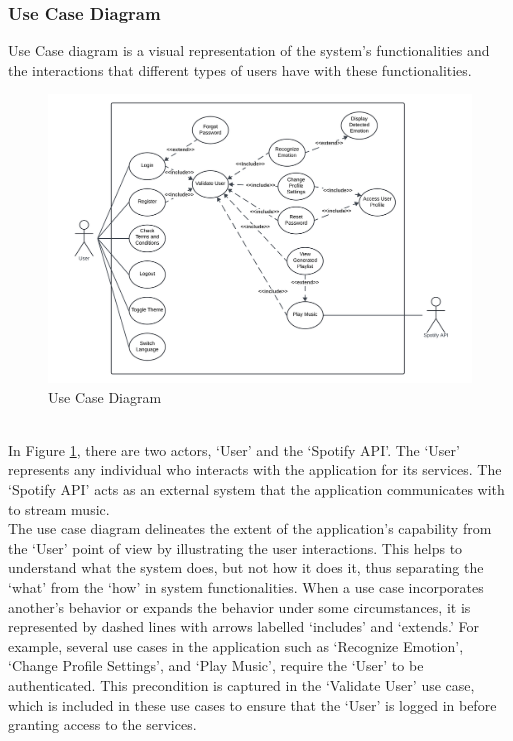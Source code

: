 \subsubsection{Use Case Diagram}
Use Case diagram is a visual representation of the system's functionalities and the interactions that different types of users have with these functionalities. \citep{ibm_2021_usecase}
\begin{figure}[!ht]
    \centering
    \includegraphics[width=14cm]{Images/usecase.png}
    \caption{Use Case Diagram}
    \label{fig:usecase}
\end{figure}
\\
\indent In Figure \ref{fig:usecase}, there are two actors, `User' and the `Spotify API'.
The `User' represents any individual who interacts with the application for its services.
The `Spotify API' acts as an external system that the application communicates with to stream music.
\\
\indent The use case diagram delineates the extent of the application's capability from the `User' point of view by illustrating the user interactions.
This helps to understand what the system does, but not how it does it, thus separating the `what' from the `how' in system functionalities.
When a use case incorporates another's behavior or expands the behavior under some circumstances, it is represented by dashed lines with arrows labelled `includes' and `extends.'
For example, several use cases in the application such as `Recognize Emotion', `Change Profile Settings', and `Play Music', require the `User' to be authenticated.
This precondition is captured in the `Validate User' use case, which is included in these use cases to ensure that the `User' is logged in before granting access to the services.
\\

